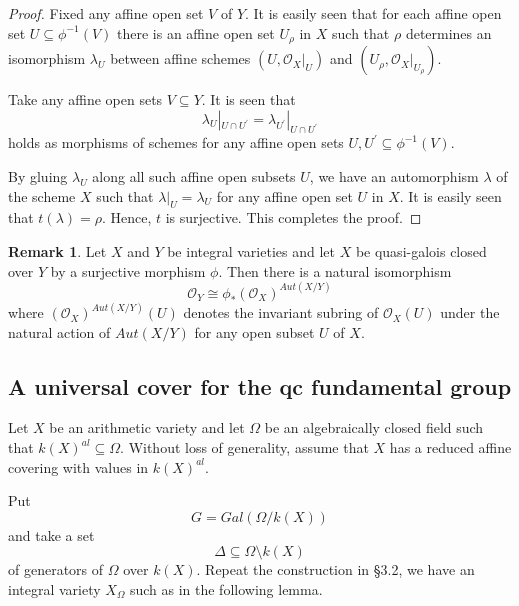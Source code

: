 \documentclass[12pt,twoside,reqno]{amsart}
\theoremstyle{definition}
\newtheorem{remark}[theorem]{Remark}
\numberwithin{equation}{section}
\begin{document}
\begin{proof}
Fixed any affine open set $V$ of $Y$. It is easily seen that for each affine
open set $U\subseteq \phi ^{-1}(V)$ there is an affine open set $U_{\rho }$
in $X$ such that $\rho $ determines an isomorphism $\lambda _{U}$ between
affine schemes $(U,\mathcal{O}_{X}|_{U})$ and $(U_{\rho },\mathcal{O}_{X}|_{U_{\rho }})$.

Take any affine open sets $V\subseteq Y$. It is seen that
\begin{equation*}
\lambda _{U}|_{U\cap U^{\prime }}=\lambda _{U^{\prime }}|_{U\cap U^{\prime }}
\end{equation*}holds as morphisms of schemes for any affine open sets $U,U^{\prime
}\subseteq \phi ^{-1}(V)$.

By gluing $\lambda _{U}$ along all such affine open subsets $U$, we have an
automorphism $\lambda $ of the scheme $X$ such that $\lambda |_{U}=\lambda
_{U}$ for any affine open set $U$ in $X$. It is easily seen that $t\left(
\lambda \right) =\rho $. Hence, ${t}$ is surjective. This completes the
proof.
\end{proof}

\begin{remark}
Let $X$ and $Y$ be integral varieties and let $X$ be quasi-galois closed
over $Y$ by a surjective morphism $\phi $. Then there is a natural
isomorphism
\begin{equation*}
\mathcal{O}_{Y}\cong \phi _{\ast }(\mathcal{O}_{X})^{{Aut}\left( X/Y\right) }
\end{equation*}where $(\mathcal{O}_{X})^{{Aut}\left( X/Y\right) }(U)$ denotes the invariant
subring of $\mathcal{O}_{X}(U)$ under the natural action of ${Aut}\left(
X/Y\right) $ for any open subset $U$ of $X$.
\end{remark}

\subsection{A universal cover for the qc fundamental group}

Let $X$ be an arithmetic variety and let $\Omega $ be an algebraically
closed field such that $k\left( X\right) ^{al}\subseteq \Omega .$ Without
loss of generality, assume that $X$ has a reduced affine covering with
values in $k\left( X\right) ^{al}.$

Put $$G=Gal\left( \Omega /k\left( X\right) \right) $$ and take a set $$\Delta
\subseteq \Omega \setminus k\left( X\right) $$ of generators of $\Omega $
over $k\left( X\right) .$ Repeat the construction in \S 3.2, we have an
integral variety $X_{\Omega }$ such as in the following lemma.
\end{document}
